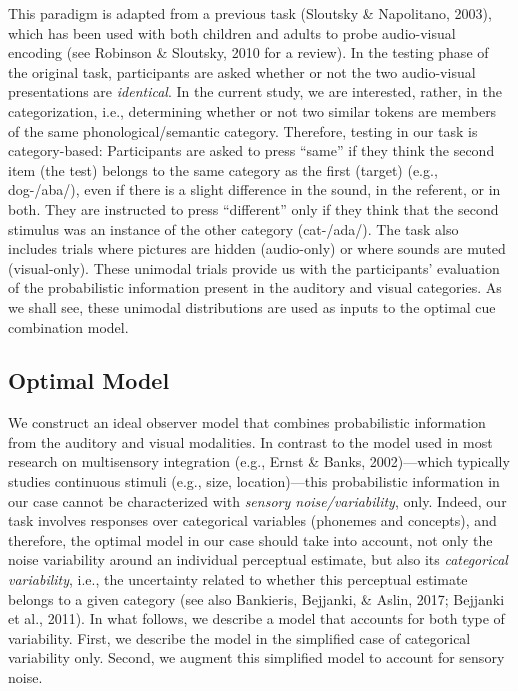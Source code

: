 \documentclass[english,floatsintext,man]{apa6}
\theoremstyle{definition}
\theoremstyle{definition}
\theoremstyle{definition}
\theoremstyle{remark}
\begin{document}
This paradigm is adapted from a previous task (Sloutsky \& Napolitano,
2003), which has been used with both children and adults to probe
audio-visual encoding (see Robinson \& Sloutsky, 2010 for a review). In
the testing phase of the original task, participants are asked whether
or not the two audio-visual presentations are \emph{identical}. In the
current study, we are interested, rather, in the categorization, i.e.,
determining whether or not two similar tokens are members of the same
phonological/semantic category. Therefore, testing in our task is
category-based: Participants are asked to press \enquote{same} if they
think the second item (the test) belongs to the same category as the
first (target) (e.g., dog-/aba/), even if there is a slight difference
in the sound, in the referent, or in both. They are instructed to press
\enquote{different} only if they think that the second stimulus was an
instance of the other category (cat-/ada/). The task also includes
trials where pictures are hidden (audio-only) or where sounds are muted
(visual-only). These unimodal trials provide us with the participants'
evaluation of the probabilistic information present in the auditory and
visual categories. As we shall see, these unimodal distributions are
used as inputs to the optimal cue combination model.

\subsection{Optimal Model}\label{optimal-model}

We construct an ideal observer model that combines probabilistic
information from the auditory and visual modalities. In contrast to the
model used in most research on multisensory integration (e.g., Ernst \&
Banks, 2002)---which typically studies continuous stimuli (e.g., size,
location)---this probabilistic information in our case cannot be
characterized with \emph{sensory noise/variability}, only. Indeed, our
task involves responses over categorical variables (phonemes and
concepts), and therefore, the optimal model in our case should take into
account, not only the noise variability around an individual perceptual
estimate, but also its \emph{categorical variability}, i.e., the
uncertainty related to whether this perceptual estimate belongs to a
given category (see also Bankieris, Bejjanki, \& Aslin, 2017; Bejjanki
et al., 2011). In what follows, we describe a model that accounts for
both type of variability. First, we describe the model in the simplified
case of categorical variability only. Second, we augment this simplified
model to account for sensory noise.
\end{document}
